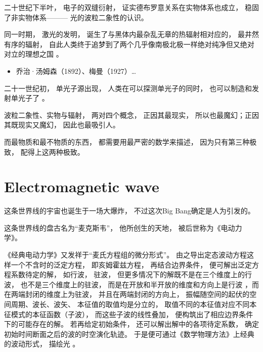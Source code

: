 二十世纪下半叶， 电子的双缝衍射， 证实德布罗意关系在实物体系也成立， 稳固了非实物体系———
光的波粒二象性的认识。

同一时期， 激光的发明， 诞生了与黑体内最杂乱无章的热辐射相对应的， 最井然有序的辐射，
自此人类终于追梦到了两个几乎像南极北极一样绝对纯净但又绝对对立的理想之国
。

\begin{itemize}[noitemsep,leftmargin=20pt]
	\item 乔治·汤姆森（1892）、梅曼（1927）\dots
\end{itemize}

二十一世纪初， 单光子源出现， 人类在可以探测单光子的同时， 也可以制造和发射单光子了
。

波粒二象性、实物与辐射， 两对四个概念， 正因其最现实， 所以也最魔幻；正因其既现实又魔幻， 因此也最吸引人。

而最物质和最不物质的东西， 都需要用最严密的数学来描述， 因为只有第三种极致， 配得上这两种极致。

\section{Electromagnetic wave}

这条世界线的宇宙也诞生于一场大爆炸， 不过这次Big Bang确定是人为引发的。

这条世界线的盘古名为“麦克斯韦”， 他所创生的天地， 被后世称为《电动力学》。

《经典电动力学》又发祥于“麦氏方程组的微分形式”。 由之导出定态波动方程这样一个不含时的泛定方程，
即亥姆霍兹方程， 再结合边界条件， 便可解出泛定方程系数待定的解， 如行波， 驻波，
但更多情况下的解既不是在三个维度上的行波， 也不是三个维度上的驻波， 而是在开放和半开放的维度和方向上是行波
，而在两端封闭的维度上为驻波， 并且在两端封闭的方向上， 振幅随空间的起伏的空间周期、波长、波矢、
本征值的取值均是分立的， 取值不同的本征值对应不同本征模式的本征函数（子波）， 而这些子波的线性叠加，
便构筑出了相应边界条件下的可能存在的解。 若再给定初始条件， 还可以解出解中的各项待定系数，
确定初始时间断面之后的波的时空演化轨迹。 于是便可通过《数学物理方法》上经典的波动形式， 描绘光
。

